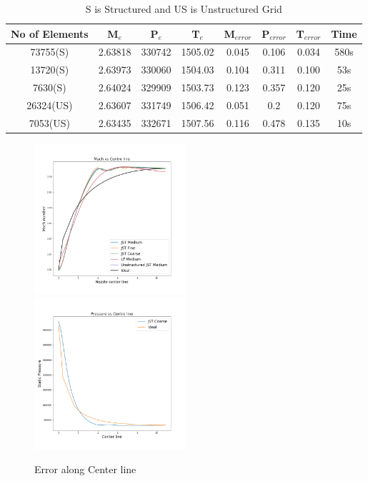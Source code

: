 \begin{table}[ht]
    \centering
    \begin{tabular}{|c|c|c|c|c|c|c|c|}
    \hline
    No of Elements & M$_e$ & P$_e$ & T$_e$ & M$_{error}$ & P$_{error}$ & T$_{error}$ & Time\\
    \hline
       73755(S)  & 2.63818 & 330742 & 1505.02 & 0.045 & 0.106 & 0.034 & 580s\\
       \hline
       13720(S)  & 2.63973 & 330060 & 1504.03 & 0.104 & 0.311 & 0.100 & 53s\\
       \hline
       7630(S)   & 2.64024 & 329909 & 1503.73 & 0.123 & 0.357 & 0.120 & 25s\\
       \hline
       26324(US)   & 2.63607 & 331749 & 1506.42 &  0.051 & 0.2 & 0.120 & 75s\\
       \hline
       7053(US)   & 2.63435 & 332671 & 1507.56 & 0.116 & 0.478 & 0.135 & 10s\\
       \hline
    \end{tabular}
    \caption{S is Structured and US is Unstructured Grid}
    \label{tab:Grid Independent Test}
\end{table}
\begin{figure}[H]
    \includegraphics[width=0.5\textwidth]{text/Mach_vs_X.png}
    \includegraphics[width=0.5\textwidth]{text/Pressure_vs_X.png}
    \caption[Error along Center line]{Error along Center line}
    \label{fig:Error along Center line}
\end{figure}
